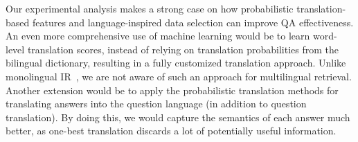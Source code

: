 \documentclass{sig-alternate-05-2015}
\begin{document}
Our experimental analysis makes a strong case on how probabilistic
translation-based features and language-inspired data selection can improve QA effectiveness.
An even more comprehensive use of machine learning would be to learn word-level translation scores, instead
of relying on translation probabilities from the bilingual dictionary, resulting in a fully customized translation
approach. Unlike monolingual IR~\cite{Bendersky:2010aa}, 
we are not aware of such an approach for multilingual retrieval. 
Another extension would be to apply the probabilistic translation methods for translating answers into
the question language (in addition to question translation). By doing this, we would capture the 
semantics of each answer much better, as one-best translation discards a lot of 
potentially useful information.



%



\end{document}
